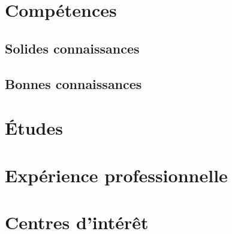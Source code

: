 \documentclass[11pt,a4paper,roman]{moderncv}
\title{}
\begin{document}
\newlength{\picwidth}
\setlength{\picwidth}{5cm}
\newlength{\picmargin}
\setlength{\picmargin}{1cm}
\setlength{\hintscolumnwidth}{3cm}
\recomputecvlengths

\makecvtitle

\section{Compétences}

\subsection{Solides connaissances}
\cvdoubleitem{}{}{}{}

\subsection{Bonnes connaissances}
\cvdoubleitem{}{}{}{}

\section{Études}

\cventry{}{}{}{}{}


\section{Expérience professionnelle}

\cventry{}{}{}{}{}

\section{Centres d'intérêt}
\cvitem{}{}{}{}

\clearpage

	
	
\recipient{}{\vspace*{2.5cm}} %
\date{Le \today}
\opening{}
\closing{}
	
\makelettertitle\justifying
	
\makeletterclosing
\end{document}
